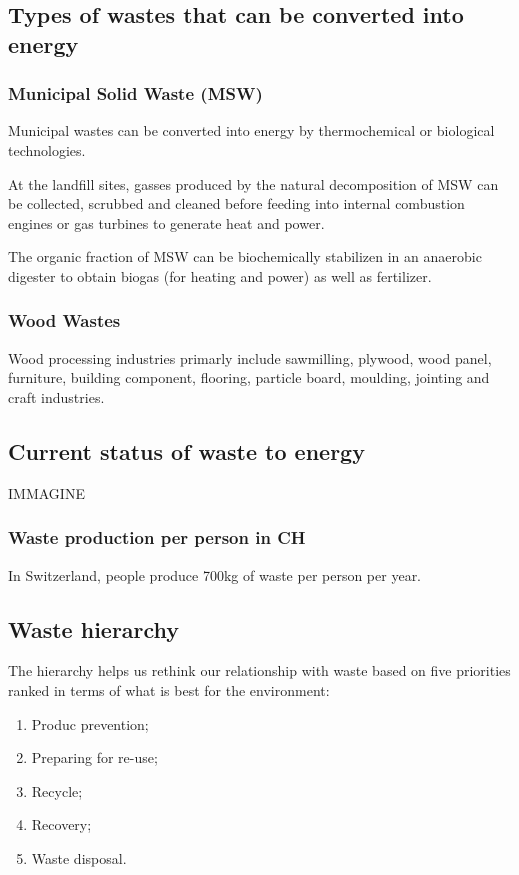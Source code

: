 \documentclass{article}
\begin{document}
\subsection{Types of wastes that can be converted into energy}
\subsubsection{Municipal Solid Waste (MSW)}
Municipal wastes can be converted into energy by thermochemical or biological technologies.

At the landfill sites, gasses produced by the natural decomposition of MSW can be collected,
scrubbed and cleaned before feeding into internal combustion engines or gas turbines to
generate heat and power.

The organic fraction of MSW can be biochemically stabilizen in an anaerobic digester to
obtain biogas (for heating and power) as well as fertilizer.

\subsubsection{Wood Wastes}
Wood processing industries primarly include sawmilling, plywood, wood panel, furniture,
building component, flooring, particle board, moulding, jointing and craft industries.



\subsection{Current status of waste to energy}
IMMAGINE

\subsubsection{Waste production per person in CH}
In Switzerland, people produce 700kg of waste per person per year.

\subsection{Waste hierarchy}
The hierarchy helps us rethink our relationship with waste based on
five priorities ranked in terms of what is best for the environment:

\begin{enumerate}
    \item Produc prevention;
    \item Preparing for re-use;
    \item Recycle;
    \item Recovery;
    \item Waste disposal.
\end{enumerate}
\end{document}
